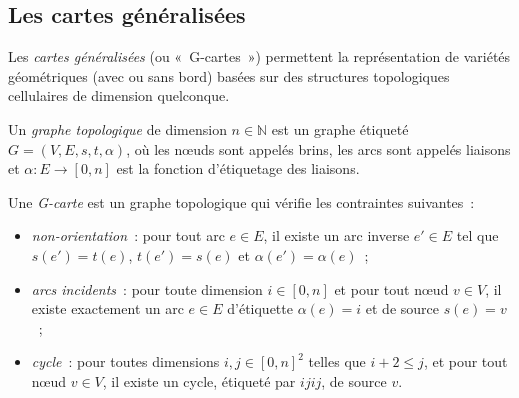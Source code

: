 \subsection[Les cartes généralisées]{Les cartes généralisées}
\label{sec:etat-art-model-regles-gcartes}


Les \emph{cartes généralisées} (ou «~G-cartes~»)
\cite{lienhardt1991topological,Damiand-Lienhardt14} permettent la représentation
de variétés géométriques (avec ou sans bord) basées sur des structures
topologiques cellulaires de dimension quelconque.

\begin{definition}[G-carte]\label{def:cartes-generalisees}%
	\label{def:gcarte}
	Un \emph{graphe topologique} de dimension $n \in \mathbb{N}$ est un graphe étiqueté
	$G = (V,E,s,t,\alpha)$, où les n\oe uds sont appelés brins, les arcs sont appelés liaisons et $\alpha : E \to [0,n]$ est la fonction d'étiquetage des liaisons.

	Une \emph{G-carte} est un graphe topologique
	qui vérifie les contraintes suivantes~:
	\begin{itemize}
		\item \emph{non-orientation}~: pour tout arc $e \in E$, il existe un arc
		      inverse $e' \in E$ tel que $s(e') = t(e)$, $t(e') = s(e)$ et
		      $\alpha(e') = \alpha(e)$~;
		\item \emph{arcs incidents}~: pour toute dimension $i \in [0,n]$ et pour
		      tout n\oe ud $v \in V$, il existe exactement un arc $e \in E$ d'étiquette
		      $\alpha(e)=i$ et de source $s(e)=v$~;
		\item \emph{cycle}~: pour toutes dimensions $i, j \in [0,n]^{2}$ telles que
		      $i+2 \leq j$, et pour tout n\oe ud $v \in V$, il existe un cycle, étiqueté
		      par \emph{$ijij$}, de source $v$.
	\end{itemize}
\end{definition}

